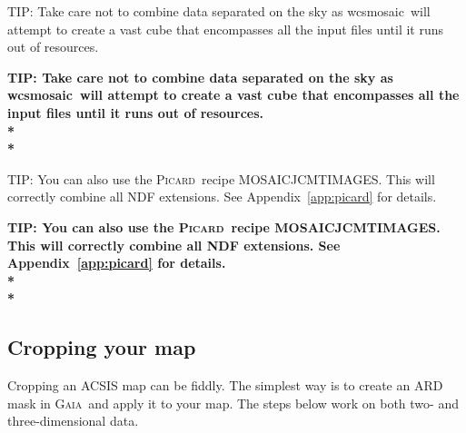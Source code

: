 \documentclass[twoside,11pt]{article}
\newcommand{\htmlref}[2]{#1}
\newenvironment{latexonly}{}{}
\newcommand{\latexhtml}[2]{#1}
\newcommand{\xref}[3]{#1}
\newcommand{\xlabel}[1]{}
\renewcommand{\_}{\texttt{\symbol{95}}}
\newenvironment{fmpage}[1]{\begin{lrbox}{\fmbox}\begin{minipage}{#1}}{\end{minipage}\end{lrbox}\fbox{\usebox{\fmbox}}}
\newcommand{\gaia}{\xref{\textsc{Gaia}}{sun214}{}}
\newcommand{\picard}{\xref{\textsc{Picard}}{sun265}{}}
\newcommand{\task}[1]{\textsf{#1}}
\newcommand{\wcsmosaic}{\xref{\task{wcsmosaic}}{sun95}{WCSMOSAIC}}
\newcommand{\cref}[3]{\latexhtml{#1~\ref{#2}}{\htmlref{#3}{#2}}}
\begin{document}
\begin{latexonly}
\begin{center}
\begin{fmpage}{0.95\linewidth}
\vspace{0.1cm}
TIP: Take care not to combine data separated on the sky as \wcsmosaic\ will attempt to create a vast cube that encompasses all the input files until it runs out of resources.
\end{fmpage}
\end{center}
\end{latexonly}

\begin{htmlonly}
\textbf{TIP: Take care not to combine data separated on the sky as \wcsmosaic\ will attempt to create a vast cube that encompasses all the input files until it runs out of resources.\\*\\*}
\end{htmlonly}


\begin{latexonly}
\begin{center}
\begin{fmpage}{0.95\linewidth}
\vspace{0.1cm}
TIP: You can also use the \picard\ recipe MOSAIC\_JCMT\_IMAGES. This will correctly combine all NDF extensions. See \cref{Appendix}{app:picard}{Picard} for details.
\end{fmpage}
\end{center}
\end{latexonly}

\begin{htmlonly}
\textbf{TIP: You can also use the \picard\ recipe MOSAIC\_JCMT\_IMAGES. This will correctly combine all NDF extensions. See \cref{Appendix}{app:picard}{Picard} for details. \\*\\*}
\end{htmlonly}


\subsection{\xlabel{Crop}Cropping your map}
\label{sec:collapse}
Cropping an ACSIS map can be fiddly. The simplest way is to create an ARD mask in \gaia\ and apply it to your map. The steps below work on both two- and three-dimensional data.
\end{document}
